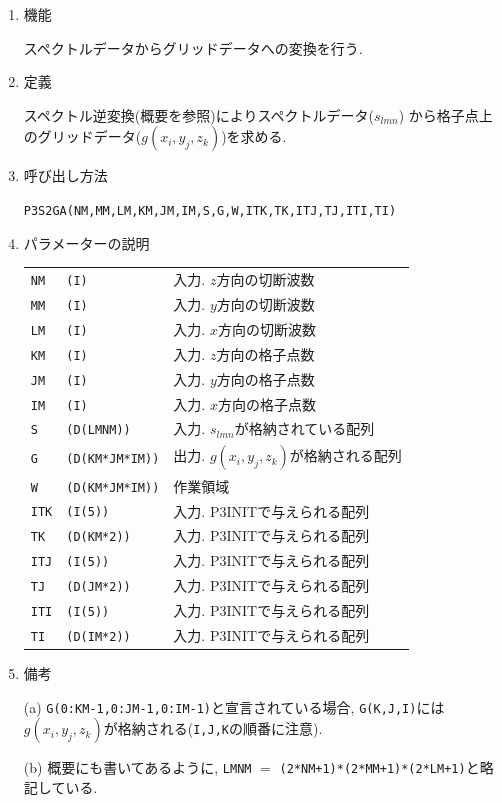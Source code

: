 \documentclass[a4j,fleqn]{jarticle}
\begin{document}
\begin{enumerate}

\item 機能 

スペクトルデータからグリッドデータへの変換を行う.

\item 定義

スペクトル逆変換(概要を参照)によりスペクトルデータ($s_{lmn}$)
から格子点上のグリッドデータ($g(x_i,y_j,z_k)$)を求める.

\item 呼び出し方法 

{\tt P3S2GA(NM,MM,LM,KM,JM,IM,S,G,W,ITK,TK,ITJ,TJ,ITI,TI)}
  
\item パラメーターの説明

\begin{tabular}{lll}
{\tt NM} & {\tt (I)} & 入力. $z$方向の切断波数\\
{\tt MM} & {\tt (I)} & 入力. $y$方向の切断波数\\
{\tt LM} & {\tt (I)} & 入力. $x$方向の切断波数\\
{\tt KM} & {\tt (I)} & 入力. $z$方向の格子点数\\
{\tt JM} & {\tt (I)} & 入力. $y$方向の格子点数\\
{\tt IM} & {\tt (I)} & 入力. $x$方向の格子点数\\
{\tt S} & {\tt (D(LMNM))} & 
                 入力. $s_{lmn}$が格納されている配列\\
{\tt G} & {\tt (D(KM*JM*IM))} & 出力. $g(x_i,y_j,z_k)$が格納される配列\\
{\tt W} & {\tt (D(KM*JM*IM))} & 作業領域\\
{\tt ITK} & {\tt (I(5))} & 入力. P3INITで与えられる配列\\
{\tt TK} & {\tt (D(KM*2))} & 入力. P3INITで与えられる配列\\
{\tt ITJ} & {\tt (I(5))} & 入力. P3INITで与えられる配列\\
{\tt TJ} & {\tt (D(JM*2))} & 入力. P3INITで与えられる配列\\
{\tt ITI} & {\tt (I(5))} & 入力. P3INITで与えられる配列\\
{\tt TI} & {\tt (D(IM*2))} & 入力. P3INITで与えられる配列
\end{tabular}

\item 備考

(a) {\tt G(0:KM-1,0:JM-1,0:IM-1)}と宣言されている場合, {\tt G(K,J,I)}には
    $g(x_i,y_j,z_k)$が格納される({\tt I,J,K}の順番に注意).
    
(b) 概要にも書いてあるように,
{\tt LMNM} $=$ {\tt (2*NM+1)*(2*MM+1)*(2*LM+1)}と略記している.

\end{enumerate}
\end{document}
